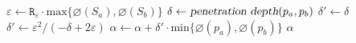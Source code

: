 \begin{algorithm}[h]
    \caption{\texttt{overlap\_proxy\_decay}($S_a,S_b$)}
    \begin{algorithmic}[1]
        \State $\varepsilon \gets \texttt{R}_{\varepsilon} \cdot \text{max}\{\diameter({S_a}), \diameter({S_b})\}$ 
            \State $\delta \gets \textsl{penetration depth}(p_a,p_b)$
            \If{$\delta > \varepsilon$}
                 \State $\delta' \gets \delta$
            \Else
                \State $\delta' \gets \varepsilon^2 / (-\delta + 2\varepsilon)$
            \EndIf
            \State $\alpha \gets \alpha + \delta' \cdot \text{min}\{\diameter(p_a),\diameter(p_b)\}$
        \EndFor
        \State \Return $\alpha$
    \end{algorithmic}
    \label{alg:overlap_area_proxy_decay}
\end{algorithm}
